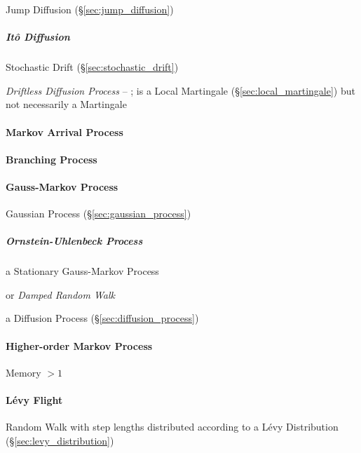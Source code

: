 Jump Diffusion (\S\ref{sec:jump_diffusion})



\subparagraph{It\^o Diffusion}\label{sec:ito_diffusion}\hfill

Stochastic Drift (\S\ref{sec:stochastic_drift})

\emph{Driftless Diffusion Process} -- ; is a Local Martingale
(\S\ref{sec:local_martingale}) but not necessarily a Martingale



\paragraph{Markov Arrival Process}\label{sec:markov_arrival_process}\hfill

\paragraph{Branching Process}\label{sec:branching_process}\hfill

\paragraph{Gauss-Markov Process}\label{sec:gauss_markov_process}\hfill

Gaussian Process (\S\ref{sec:gaussian_process})



\subparagraph{Ornstein-Uhlenbeck Process}\label{sec:ornstein_uhlenbeck}\hfill

a Stationary Gauss-Markov Process

or \emph{Damped Random Walk}

a Diffusion Process (\S\ref{sec:diffusion_process})



\paragraph{Higher-order Markov Process}\label{sec:higher_order_markov}\hfill

Memory $>1$



\paragraph{L\'evy Flight}\label{sec:levy_flight}\hfill

Random Walk with step lengths distributed according to a L\'evy Distribution
(\S\ref{sec:levy_distribution})

